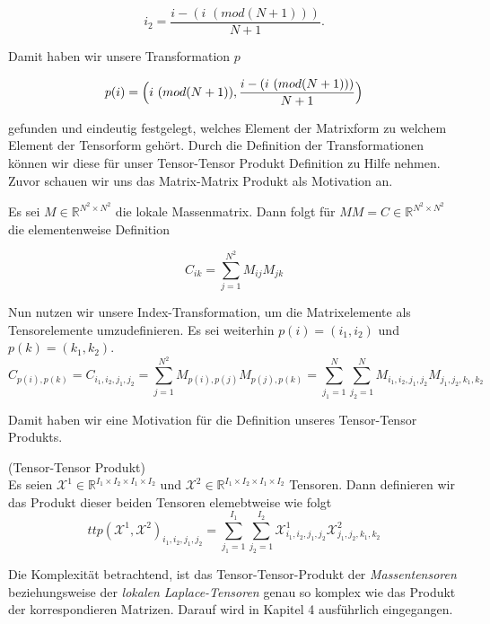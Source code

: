 \begin{equation} \label{eq:tupel3}
 i_2 = \dfrac{ i -  (i \, \, (mod (N+1))) } {N+1}.
\end{equation}

Damit haben wir unsere Transformation $p$

\begin{equation} \label{eq:p}
p(i)= \Big{(} i \, \, (mod (N+1)),  \dfrac{ i -  (i \, \, (mod (N+1))) } {N+1} \Big{)}
\end{equation}

gefunden und eindeutig festgelegt, welches Element der Matrixform zu welchem Element der Tensorform gehört.
Durch die Definition der Transformationen können wir diese für unser Tensor-Tensor Produkt Definition zu Hilfe nehmen. Zuvor schauen wir uns das Matrix-Matrix Produkt als Motivation an.

Es sei $M \in \mathbb{R}^{N^2 \times N^2}$ die lokale Massenmatrix. Dann folgt für $MM=C \in \mathbb{R}^{N^2 \times N^2}$ die elementenweise Definition

\begin{equation}
C_{ik}=\sum_{j=1}^{N^2} M_{ij} M_{jk}
\end{equation}

Nun nutzen wir unsere Index-Transformation, um die Matrixelemente als Tensorelemente umzudefinieren. Es sei weiterhin $p(i)=(i_1,i_2)$ und $p(k)=(k_1,k_2)$.
\begin{equation}
C_{p(i),p(k)} = C_{i_1,i_2,j_1,j_2} =  \sum_{j=1}^{N^2} M_{p(i),p(j)} M_{p(j),p(k)} = \sum_{j_1=1}^N \sum_{j_2=1}^N M_{i_1,i_2,j_1,j_2} M_{j_1,j_2,k_1,k_2} 
\end{equation}

Damit haben wir eine Motivation für die Definition unseres Tensor-Tensor Produkts.
\begin{Definition} (Tensor-Tensor Produkt) \\
Es seien $\pmb{\mathscr{X}}^1  \in \mathbb{R}^{I_1 \times I_2 \times I_1 \times I_2}$ und $\pmb{\mathscr{X}}^2 \in \mathbb{R}^{I_1 \times I_2 \times I_1 \times I_2}$ Tensoren.
Dann definieren wir das Produkt dieser beiden Tensoren elemebtweise wie folgt
\begin{equation}
ttp(\pmb{\mathscr{X}}^1,\pmb{\mathscr{X}}^2)_{i_1,i_2,j_1,j_2}= \sum_{j_1=1}^{I_1} \sum_{j_2=1}^{I_2} \pmb{\mathscr{X}}^1_{i_1,i_2,j_1,j_2} \pmb{\mathscr{X}}^2_{j_1,j_2,k_1,k_2} 
\end{equation}
\end{Definition}

Die Komplexität betrachtend, ist das Tensor-Tensor-Produkt der \textit{Massentensoren} beziehungsweise der \textit{lokalen Laplace-Tensoren} genau so komplex wie das Produkt der korrespondieren Matrizen. Darauf wird in Kapitel 4 ausführlich eingegangen.

